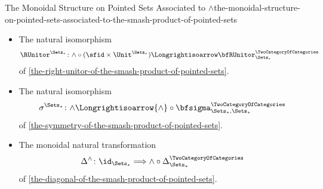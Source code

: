 \begin{proposition}{The Monoidal Structure on Pointed Sets Associated to $\wedge$}{the-monoidal-structure-on-pointed-sets-associated-to-the-smash-product-of-pointed-sets}
\begin{itemize}
            \[
                \LUnitor^{\Sets_{*}}%
                \colon%
                {\wedge}\circ{(\Unit^{\Sets_{*}}\times\id_{\Sets_{*}})}
                \Longrightisoarrow
                \bfLUnitor^{\TwoCategoryOfCategories}_{\Sets_{*}}
            \]
            of \cref{the-left-unitor-of-the-smash-product-of-pointed-sets}.
        \item{}The natural isomorphism
            \[
                \RUnitor^{\Sets_{*}}%
                \colon%
                {\wedge}\circ{({\sfid}\times{\Unit^{\Sets_{*}}})}%
                \Longrightisoarrow%
                \bfRUnitor^{\TwoCategoryOfCategories}_{\Sets_{*}}%
            \]
            of \cref{the-right-unitor-of-the-smash-product-of-pointed-sets}.
        \item{}The natural isomorphism
            \[
                \sigma^{\Sets_{*}}
                \colon
                {\wedge}
                \Longrightisoarrow
                {\wedge}\circ{\bfsigma^{\TwoCategoryOfCategories}_{\Sets_{*},\Sets_{*}}}
            \]
            of \cref{the-symmetry-of-the-smash-product-of-pointed-sets}.
        \item{}The monoidal natural transformation
            \[
                \Delta^{\wedge}%
                \colon%
                \id_{\Sets_{*}}%
                \Longrightarrow%
                \wedge\circ\Delta^{\TwoCategoryOfCategories}_{\Sets_{*}}%
            \]
            of \cref{the-diagonal-of-the-smash-product-of-pointed-sets}.
    \end{itemize}
\end{proposition}
